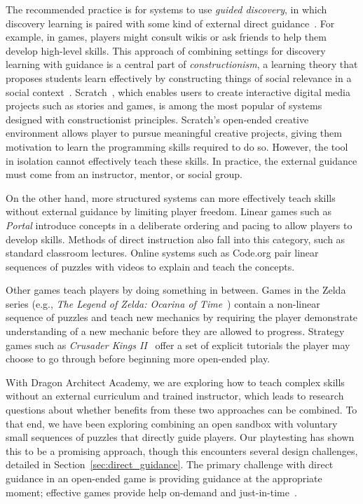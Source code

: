\documentclass{sig-alternate}
\newcommand{\gametitle}{{\color{RoyalPurple} Dragon Architect Academy}}
\begin{document}
The recommended practice is for systems to use \emph{guided discovery}, in which discovery learning is paired with some kind of external direct guidance~\cite{mayer2004should}.  For example, in games, players might consult wikis or ask friends to help them develop high-level skills.
This approach of combining settings for discovery learning with guidance is a central part of \emph{constructionism}, a learning theory that proposes students learn effectively by constructing things of social relevance in a social context~\cite{kafai06constructionism}.
Scratch~\cite{maloney2010scratch}, which enables users to create interactive digital media projects such as stories and games, is among the most popular of systems designed with constructionist principles.
Scratch's open-ended creative environment allows player to pursue meaningful creative projects, giving them motivation to learn the programming skills required to do so.
However, the tool in isolation cannot effectively teach these skills.
In practice, the external guidance must come from an instructor, mentor, or social group.

On the other hand, more structured systems can more effectively teach skills without external guidance by limiting player freedom.
Linear games such as \emph{Portal} introduce concepts in a deliberate ordering and pacing to allow players to develop skills.
Methods of direct instruction also fall into this category, such as standard classroom lectures.
Online systems such as Code.org pair linear sequences of puzzles with videos to explain and teach the concepts.

Other games teach players by doing something in between. 
Games in the Zelda series (e.g., \emph{The Legend of Zelda: Ocarina of Time}~\cite{zelda_oot}) contain a non-linear sequence of puzzles and teach new mechanics by requiring the player demonstrate understanding of a new mechanic before they are allowed to progress. 
Strategy games such as \emph{Crusader Kings II}~\cite{ck2} offer a set of explicit tutorials the player may choose to go through before beginning more open-ended play.

With \gametitle{}, we are exploring how to teach complex skills without an external curriculum and trained instructor, which leads to research questions about whether benefits from these two approaches can be combined.
To that end, we have been exploring combining an open sandbox with voluntary small sequences of puzzles that directly guide players.
Our playtesting has shown this to be a promising approach, though this encounters several design challenges, detailed in Section~\ref{sec:direct_guidance}.
The primary challenge with direct guidance in an open-ended game is providing guidance at the appropriate moment;
effective games provide help on-demand and just-in-time~\cite{gee2003video}.
\end{document}
